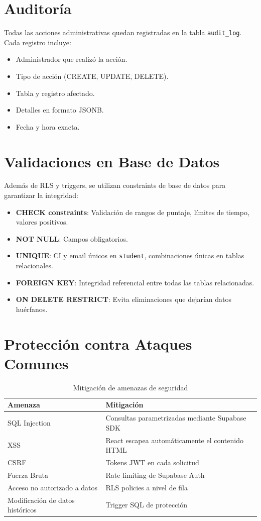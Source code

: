 \section{Auditoría}

Todas las acciones administrativas quedan registradas en la tabla \texttt{audit\_log}. Cada registro incluye:

\begin{itemize}
    \item Administrador que realizó la acción.
    \item Tipo de acción (CREATE, UPDATE, DELETE).
    \item Tabla y registro afectado.
    \item Detalles en formato JSONB.
    \item Fecha y hora exacta.
\end{itemize}

\section{Validaciones en Base de Datos}

Además de RLS y triggers, se utilizan constraints de base de datos para garantizar la integridad:

\begin{itemize}
    \item \textbf{CHECK constraints}: Validación de rangos de puntaje, límites de tiempo, valores positivos.
    \item \textbf{NOT NULL}: Campos obligatorios.
    \item \textbf{UNIQUE}: CI y email únicos en \texttt{student}, combinaciones únicas en tablas relacionales.
    \item \textbf{FOREIGN KEY}: Integridad referencial entre todas las tablas relacionadas.
    \item \textbf{ON DELETE RESTRICT}: Evita eliminaciones que dejarían datos huérfanos.
\end{itemize}

\section{Protección contra Ataques Comunes}

\begin{table}[H]
\centering
\begin{tabularx}{\textwidth}{l Y}
\toprule
\textbf{Amenaza} & \textbf{Mitigación} \\
\midrule
SQL Injection & Consultas parametrizadas mediante Supabase SDK \\
XSS & React escapea automáticamente el contenido HTML \\
CSRF & Tokens JWT en cada solicitud \\
Fuerza Bruta & Rate limiting de Supabase Auth \\
Acceso no autorizado a datos & RLS policies a nivel de fila \\
Modificación de datos históricos & Trigger SQL de protección \\
\bottomrule
\end{tabularx}
\caption{Mitigación de amenazas de seguridad}
\end{table}
